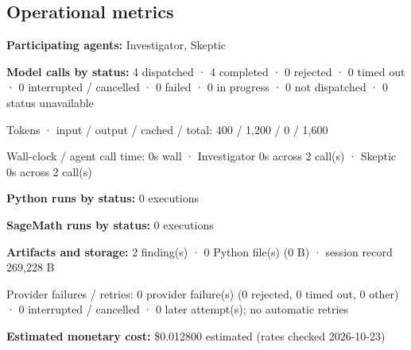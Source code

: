 \documentclass[11pt]{article}
\begin{document}
\subsection{Operational metrics}
\textbf{Participating agents:} Investigator, Skeptic\par
\textbf{Model calls by status:} 4 dispatched · 4 completed · 0 rejected · 0 timed out · 0 interrupted / cancelled · 0 failed · 0 in progress · 0 not dispatched · 0 status unavailable\par
Tokens · input / output / cached / total: 400 / 1,200 / 0 / 1,600\par
Wall-clock / agent call time: 0s wall · Investigator 0s across 2 call(s) · Skeptic 0s across 2 call(s)\par
\textbf{Python runs by status:} 0 executions\par
\textbf{SageMath runs by status:} 0 executions\par
\textbf{Artifacts and storage:} 2 finding(s) · 0 Python file(s) (0 B) · session record 269,228 B\par
Provider failures / retries: 0 provider failure(s) (0 rejected, 0 timed out, 0 other) · 0 interrupted / cancelled · 0 later attempt(s); no automatic retries\par
\textbf{Estimated monetary cost:} \$0.012800 estimated (rates checked 2026-10-23)\par
\end{document}
